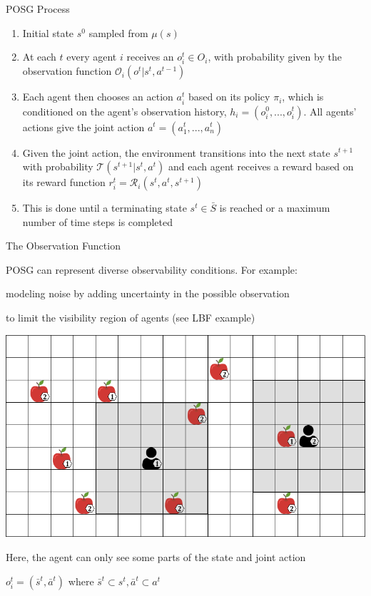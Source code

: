 \begin{frame}{POSG Process}

\begin{enumerate}
    \item<1-> Initial state $s^0$ sampled from $\mu(s)$
    \item<2-> At each $t$ every agent $i$ receives an  $o^{t}_{i} \in O_i$, with probability given by the observation function $\mathcal{O}_i(o^{t}|s^t, a^{t-1})$
    \item<3-> Each agent then chooses an action $a^{t}_{i}$ based on its policy $\pi_{i}$, which is conditioned on the agent's observation history, $h_{i} = (o^{0}_{i}, ..., o_{i}^{t})$. All agents' actions give the joint action $a^t = (a^{t}_{1}, ..., a^{t}_n)$
    \item<4-> Given the joint action, the environment transitions into the next state $s^{t+1}$ with probability $\mathcal{T}(s^{t+1}|s^t, a^t)$ and each agent receives a reward based on its reward function $r^{t}_{i} = \mathcal{R}_{i}(s^t, a^t, s^{t+1})$
    \item<5-> This is done until a terminating state $s^{t} \in \bar{S}$ is reached or a maximum number of time steps is completed
\end{enumerate}
    
\end{frame}

\begin{frame}{The Observation Function}

POSG can represent diverse observability conditions. For example:
\blist
    \item modeling noise by adding uncertainty in the possible observation
    \item to limit the visibility region of agents (see LBF example)
\elist

\vspace{10pt}

\bcol
    	\centering
        \includegraphics[width = 0.95\linewidth]{images/environments/lbf/foraging_po.png}
        
        \blist 
            \item Here, the agent can only see some parts of the state and joint action
            \item \(o^{t}_{i} = (\bar{s}^t, \bar{a}^t)\) where \(\bar{s}^t \subset s^t, \bar{a}^t \subset a^t\)
        \elist
\ecol
\end{frame}

